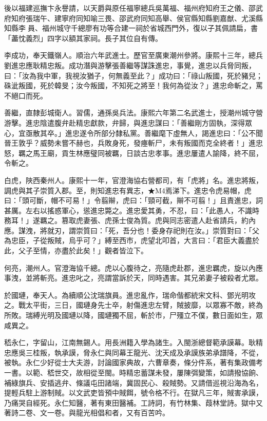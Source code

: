 \begin{pinyinscope}
後以福建巡撫卞永譽請，以天爵與原任福寧總兵吳萬福、福州府知府王之儀、邵武府知府張瑞午、建寧府同知喻三畏、邵武府同知高舉、侯官縣知縣劉嘉猷、尤溪縣知縣李員、福州城守千總廖有功等合建一祠於省城西門外，復以子其佩請扁，書「藎忱義烈」四字以額其家祠。長子其位自有傳。

李成功，奉天鐵嶺人。順治六年武進士。歷官至廣東潮州參將。康熙十三年，總兵劉進忠應耿精忠叛。成功潛與游擊張善繼等謀誅進忠，事覺，進忠以兵脅同叛，曰：「汝為我中軍，我視汝猶子，何無義至此？」成功曰：「祿山叛國，死於豬兒；硃泚叛國，死於韓旻；汝今叛國，不知死之將至！我何為從汝？」進忠命斬之，罵不絕口而死。

善繼，直隸彭城衛人。習儒，通孫吳兵法。康熙六年第二名武進士，授潮州城守營游擊。進忠陰遣腹弁赴精忠獻款，弁歸，與進忠謀曰：「善繼剛方固執，深得眾心，宜亟散其卒。」進忠遂令所部分隸私黨。善繼麾下虛無人，謁進忠曰：「公不聞晉王敦乎？威勢未嘗不赫也，兵敗身死，發瘞斬尸，未有叛國而克全終者！」進忠怒，羈之馬王廟，貢生林應璧同被羈，日談古忠孝事。進忠屢遣人諭降，終不屈，令斬之。

白虎，陜西秦州人。康熙十一年，官澄海協右營都司，有「虎將」名。進忠將叛，調虎與其子崇質入郡。至，則知進忠有異志，★M4焉涕下。進忠令虎易帽，虎曰：「頭可斷，帽不可易！」令翦辮，虎曰：「頸可截，辮不可翦！」且責進忠，詞甚厲。左右以搖惑軍心，慫進忠斃之。進忠愛其勇，不忍，曰：「此愚人，不識時務耳！」遂羈之。篡取虎妻張、虎孫士俊為質。虎與同志密遣人赴省請兵，約內應。謀洩，將就刃，謂崇質曰：「死，吾分也！委身存祀則在汝。」崇質對曰：「父為忠臣，子從叛賊，烏乎可？」縛至西市，虎望北叩首，大言曰：「君臣大義盡於此，父子至情，亦盡於此矣！」觀者皆泣下。

何亮，潮州人。官澄海協千總。虎以心腹待之，亮隨虎赴郡，進忠羈虎，旋以內應事洩，並將斬亮。進忠叱之，亮謂當訴於天，同時遇害。其兄弟妻子被殺者尤眾。

於國璉，奉天人。為續順公沈瑞旗員。進忠亂作，瑞命偕都統宋文科、鄧光明攻之。戰太平街，三日，國璉身先士卒，射傷進忠左臂，賊披靡，以眾寡不敵，終為所敗。瑞縛光明及國璉以降，國璉獨不屈，斬於市，尸殭立不僕，數日面如生，眾咸異之。

嵇永仁，字留山，江南無錫人。用長洲籍入學為諸生。入閩浙總督範承謨幕。耿精忠應吳三桂叛，執承謨，脅永仁與同幕王龍光、沈天成及承謨族弟承譜降，不從，被執。永仁少好從士大夫游，討論國家典故，六曹章奏，條分件系，著有集政備考一書。以範、嵇世交，故相從至閩。時精忠蓄謀未發，屢陳弭變策，如請撥協餉、補綠旗兵、安插逃弁、條議屯田諸端，冀固民心、殺賊勢。又請借巡視沿海為名，提輕兵駐上游制賊。以文武吏皆預中賊餌，號令格不行。在獄凡三年，賊害承謨，乃痛哭自經死。永仁知醫，著有東田醫補。工詩詞，有竹林集、葭林堂詩。獄中又著詩二卷、文一卷。與龍光相倡和者，又有百苦吟。


\end{pinyinscope}
